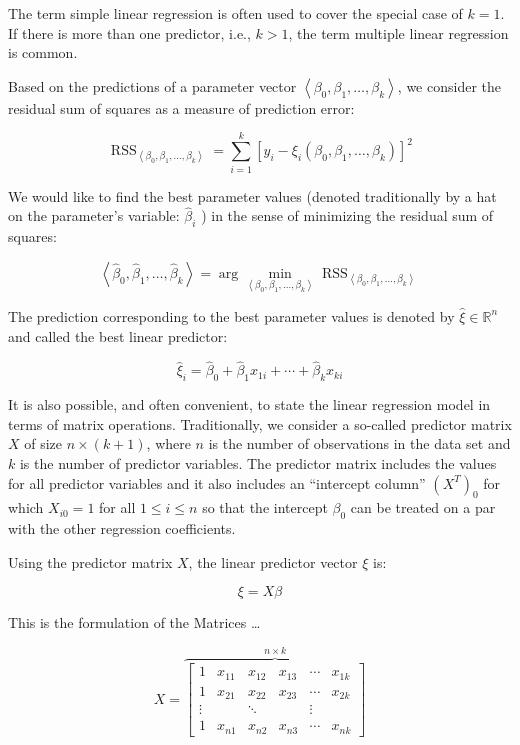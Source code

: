 \documentclass[
  12 pt,
  a4paper,
]{book}
\numberwithin{equation}{section}
\theoremstyle{plain}      %
\theoremstyle{definition} %
\theoremstyle{remark}     %
\theoremstyle{note}         %
\begin{document}
The term simple linear regression is often used to cover the special
case of \(k=1\). If there is more than one predictor, i.e., \(k>1\), the
term multiple linear regression is common.

Based on the predictions of a parameter vector
\(\left\langle\beta_{0}, \beta_{1}, \ldots, \beta_{k}\right\rangle\), we
consider the residual sum of squares as a measure of prediction error:

\[
\operatorname{RSS}_{\left\langle\beta_{0}, \beta_{1}, \ldots, \beta_{k}\right\rangle}=\sum_{i=1}^{k}\left[y_{i}-\xi_{i}\left(\beta_{0}, \beta_{1}, \ldots, \beta_{k}\right)\right]^{2}
\]

We would like to find the best parameter values (denoted traditionally
by a hat on the parameter's variable: \(\hat{\beta}_{i}\) ) in the sense
of minimizing the residual sum of squares:

\[
\left\langle\hat{\beta}_{0}, \hat{\beta}_{1}, \ldots, \hat{\beta}_{k}\right\rangle=\arg \min _{\left\langle\beta_{0}, \beta_{1}, \ldots, \beta_{k}\right\rangle} \operatorname{RSS}_{\left\langle\beta_{0}, \beta_{1}, \ldots, \beta_{k}\right\rangle}
\]

The prediction corresponding to the best parameter values is denoted by
\(\hat{\xi} \in \mathbb{R}^{n}\) and called the best linear predictor:

\[
\hat{\xi}_{i}=\hat{\beta}_{0}+\hat{\beta}_{1} x_{1 i}+\cdots+\hat{\beta}_{k} x_{k i}
\]

It is also possible, and often convenient, to state the linear
regression model in terms of matrix operations. Traditionally, we
consider a so-called predictor matrix \(X\) of size \(n \times(k+1)\),
where \(n\) is the number of observations in the data set and \(k\) is
the number of predictor variables. The predictor matrix includes the
values for all predictor variables and it also includes an ``intercept
column'' \(\left(X^{T}\right)_{0}\) for which \(X_{i 0}=1\) for all
\(1 \leq i \leq n\) so that the intercept \(\beta_{0}\) can be treated
on a par with the other regression coefficients.

Using the predictor matrix \(X\), the linear predictor vector \(\xi\)
is:

\[
\xi=X \beta
\]

This is the formulation of the Matrices \ldots{}

\[
X=\overbrace{
\left[\begin{array}{cccccc}
1 & x_{11} & x_{12} & x_{13} & \cdots & x_{1 k} \\
1 & x_{21} & x_{22} & x_{23} & \cdots & x_{2 k} \\
\vdots & & \ddots & & \vdots \\
1 & x_{n 1} & x_{n 2} & x_{n 3} & \cdots & x_{n k}
\end{array}\right]
}^{n \times k}
\]
\end{document}
